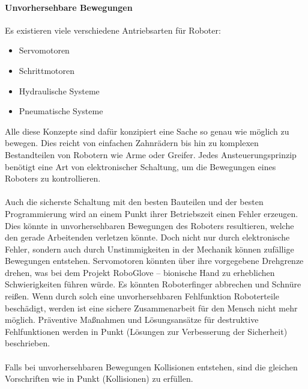 \documentclass[titlepage,12pt,twoside]{article}
\begin{document}
\paragraph{Unvorhersehbare Bewegungen}
\hfill \break
\hfill \break
Es existieren viele verschiedene Antriebsarten für Roboter: \\
\begin{itemize}
	\item Servomotoren
	\item Schrittmotoren
	\item Hydraulische Systeme
	\item Pneumatische Systeme
\end{itemize}
\hfill \break
Alle diese Konzepte sind dafür konzipiert eine Sache so genau wie möglich zu 
bewegen. Dies reicht von einfachen Zahnrädern bis hin zu komplexen Bestandteilen 
von Robotern wie Arme oder Greifer. Jedes Ansteuerungsprinzip benötigt eine Art 
von elektronischer Schaltung, um die Bewegungen eines Roboters zu kontrollieren. \\
\\
Auch die sicherste Schaltung mit den besten Bauteilen und der besten Programmierung 
wird an einem Punkt ihrer Betriebszeit einen Fehler erzeugen. Dies könnte in 
unvorhersehbaren Bewegungen des Roboters resultieren, welche den gerade Arbeitenden 
verletzen könnte. Doch nicht nur durch elektronische Fehler, sondern auch durch 
Unstimmigkeiten in der Mechanik können zufällige Bewegungen entstehen. Servomotoren 
könnten über ihre vorgegebene Drehgrenze drehen, was bei dem Projekt RoboGlove – 
bionische Hand zu erheblichen Schwierigkeiten führen würde. Es könnten Roboterfinger 
abbrechen und Schnüre reißen. Wenn durch solch eine unvorhersehbaren Fehlfunktion 
Roboterteile beschädigt, werden ist eine sichere Zusammenarbeit für den Mensch 
nicht mehr möglich. Präventive Maßnahmen und Lösungsansätze für destruktive 
Fehlfunktionen werden in Punkt (Lösungen zur Verbesserung der Sicherheit) 
beschrieben. \\
\\
Falls bei unvorhersehbaren Bewegungen Kollisionen entstehen, sind die gleichen 
Vorschriften wie in Punkt (Kollisionen) zu erfüllen. \\
\end{document}
